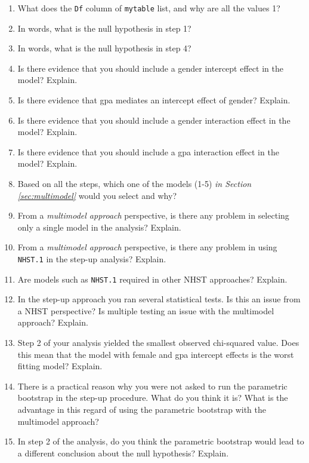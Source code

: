 \documentclass[]{article}
\begin{document}
\begin{enumerate}[resume]
\item What does the \texttt{Df} column of \texttt{mytable} list, and why are all the values 1?
\item In words, what is the null hypothesis in step 1?
\item In words, what is the null hypothesis in step 4?
\item Is there evidence that you should include a gender intercept effect in the model? Explain.
\item Is there evidence that gpa mediates an intercept effect of gender? Explain.
\item Is there evidence that you should include a gender interaction effect in the model? Explain.
\item Is there evidence that you should include a gpa interaction effect in the model? Explain.
\item Based on all the steps, which one of the models (1-5) \emph{in Section \ref{sec:multimodel}} would you select and why?
\item From a \emph{multimodel approach} perspective, is there any problem in selecting only a single model in the analysis? Explain.
\item From a \emph{multimodel approach} perspective, is there any problem in using \texttt{NHST.1} in the step-up analysis? Explain.
\item Are models such as \texttt{NHST.1} required in other NHST approaches? Explain.
\item In the step-up approach you ran several statistical tests. Is this an issue from a NHST perspective? Is multiple testing an issue with the multimodel approach? Explain.
\item Step 2 of your analysis yielded the smallest observed chi-squared value. Does this mean that the model with female and gpa intercept effects is the worst fitting model? Explain.
\item There is a practical reason why you were not asked to run the parametric bootstrap in the step-up procedure. What do you think it is? What is the advantage in this regard of using the parametric bootstrap with the multimodel approach?
\item In step 2 of the analysis, do you think the parametric bootstrap would lead to a different conclusion about the null hypothesis? Explain.
\end{enumerate}
\end{document}
